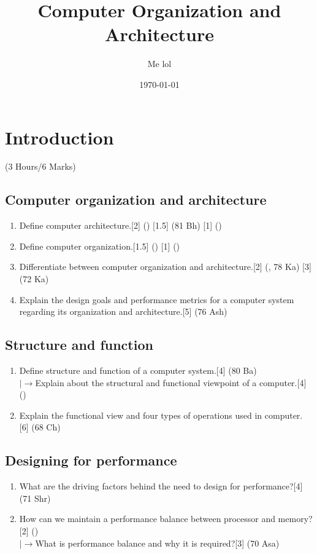 \documentclass[12pt]{article}
\title{Computer Organization and Architecture}
\author{Me lol}
\date{\today}
\newcommand{\lb}{\\$\left|\rightarrow\right.$}
\begin{document}
\maketitle
\pagebreak
\tableofcontents
\pagebreak

\section{Introduction}
	\begin{center}(3 Hours/6 Marks)\end{center}
	\subsection{Computer organization and architecture}
	\begin{enumerate}[noitemsep, topsep = 0pt]
	\item Define computer architecture.\hfill[2] () [1.5] (81 Bh) [1] ()
	\item Define computer organization.\hfill[1.5] () [1] ()
	\item Differentiate between computer organization and architecture.\hfill[2] (, 78 Ka) [3] (72 Ka)
	\item Explain the design goals and performance metrics for a computer system regarding its organization and architecture.\hspace{9.9cm}[5] (76 Ash)
	\end{enumerate}
	\subsection{Structure and function}
	\begin{enumerate}[noitemsep, topsep = 0pt]
	\item Define structure and function of a computer system.\hfill[4] (80 Ba)
	\lb Explain about the structural and functional viewpoint of a computer.\hfill[4] ()
	\item Explain the functional view and four types of operations used in computer. \hfill[6] (68 Ch)
	\end{enumerate}
	\subsection{Designing for performance}
	\begin{enumerate}[noitemsep, topsep = 0pt]
	\item What are the driving factors behind the need to design for performance?\hfill[4] (71 Shr)
	\item How can we maintain a performance balance between processor and memory?\hfill[2] ()
	\lb What is performance balance and why it is required?\hfill[3] (70 Asa)
	\end{enumerate}
\end{document}
